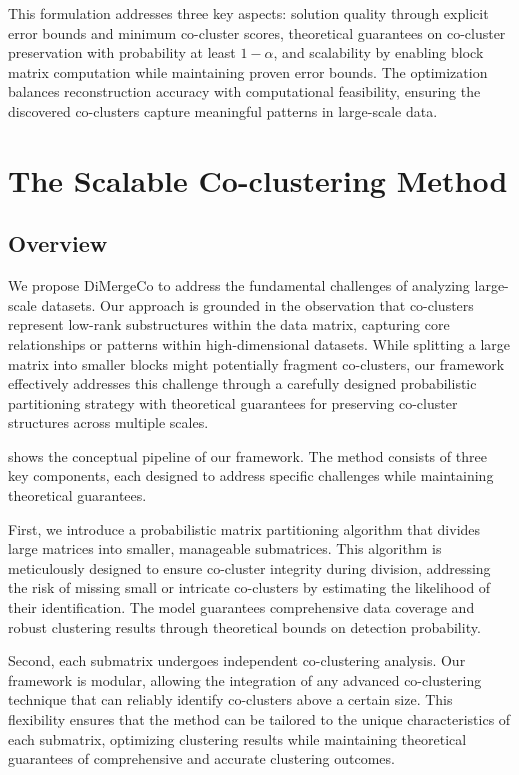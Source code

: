 \documentclass[journal]{IEEEtran}
\begin{document}
This formulation addresses three key aspects: solution quality through explicit error bounds and minimum co-cluster scores, theoretical guarantees on co-cluster preservation with probability at least $1-\alpha$, and scalability by enabling block matrix computation while maintaining proven error bounds. The optimization balances reconstruction accuracy with computational feasibility, ensuring the discovered co-clusters capture meaningful patterns in large-scale data.

\section{The Scalable Co-clustering Method}
\label{sec:proposed_model}

\subsection{Overview}
\label{subsec:overview}
We propose DiMergeCo to address the fundamental challenges of analyzing large-scale datasets. Our approach is grounded in the observation that co-clusters represent low-rank substructures within the data matrix, capturing core relationships or patterns within high-dimensional datasets. While splitting a large matrix into smaller blocks might potentially fragment co-clusters, our framework effectively addresses this challenge through a carefully designed probabilistic partitioning strategy with theoretical guarantees for preserving co-cluster structures across multiple scales.

 shows the conceptual pipeline of our framework. The method consists of three key components, each designed to address specific challenges while maintaining theoretical guarantees.

First, we introduce a probabilistic matrix partitioning algorithm that divides large matrices into smaller, manageable submatrices. This algorithm is meticulously designed to ensure co-cluster integrity during division, addressing the risk of missing small or intricate co-clusters by estimating the likelihood of their identification. The model guarantees comprehensive data coverage and robust clustering results through theoretical bounds on detection probability.

Second, each submatrix undergoes independent co-clustering analysis. Our framework is modular, allowing the integration of any advanced co-clustering technique that can reliably identify co-clusters above a certain size. This flexibility ensures that the method can be tailored to the unique characteristics of each submatrix, optimizing clustering results while maintaining theoretical guarantees of comprehensive and accurate clustering outcomes.
\end{document}
